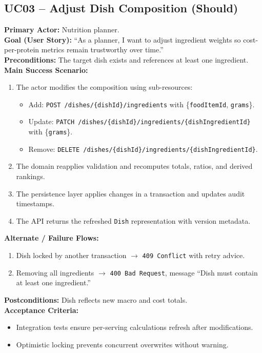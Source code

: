 \documentclass[11pt]{article}
\begin{document}
\subsection*{UC03 -- Adjust Dish Composition (Should)}
\textbf{Primary Actor:} Nutrition planner.\\
\textbf{Goal (User Story):} ``As a planner, I want to adjust ingredient weights so cost-per-protein metrics remain trustworthy over time.''\\
\textbf{Preconditions:} The target dish exists and references at least one ingredient.\\
\textbf{Main Success Scenario:}
\begin{enumerate}[label=\arabic*.]
  \item The actor modifies the composition using sub-resources:
    \begin{itemize}[noitemsep]
      \item Add: \texttt{POST /dishes/\{dishId\}/ingredients} with \{\texttt{foodItemId}, \texttt{grams}\}.
      \item Update: \texttt{PATCH /dishes/\{dishId\}/ingredients/\{dishIngredientId\}} with \{\texttt{grams}\}.
      \item Remove: \texttt{DELETE /dishes/\{dishId\}/ingredients/\{dishIngredientId\}}.
    \end{itemize}
  \item The domain reapplies validation and recomputes totals, ratios, and derived rankings.
  \item The persistence layer applies changes in a transaction and updates audit timestamps.
  \item The API returns the refreshed \texttt{Dish} representation with version metadata.
\end{enumerate}
\textbf{Alternate / Failure Flows:}
\begin{enumerate}[label=\arabic*F.]
  \item Dish locked by another transaction $\rightarrow$ \texttt{409 Conflict} with retry advice.
  \item Removing all ingredients $\rightarrow$ \texttt{400 Bad Request}, message ``Dish must contain at least one ingredient.''
\end{enumerate}
\textbf{Postconditions:} Dish reflects new macro and cost totals.\\
\textbf{Acceptance Criteria:}
\begin{itemize}[noitemsep]
  \item Integration tests ensure per-serving calculations refresh after modifications.
  \item Optimistic locking prevents concurrent overwrites without warning.
\end{itemize}
\end{document}
